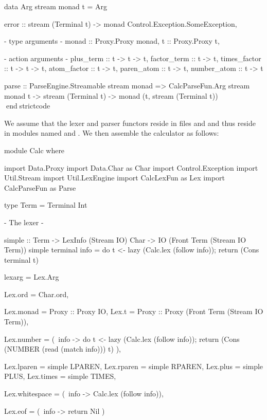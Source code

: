 \documentclass[10pt]{article}
\begin{document}
\begin{strictcode}
\begin{strictcode}
\begin{strictcode}
\begin{strictcode}
\begin{strictcode}
\begin{strictcode}
\begin{strictcode}
\begin{strictcode}
\begin{strictcode}
\begin{strictcode}
\begin{strictcode}
\begin{strictcode}
\begin{strictcode}
\begin{bigstrictcode}
\begin{strictcode}
\begin{strictcode}
\begin{bigstrictcode}
\begin{strictcode}
\begin{strictcode}
data Arg stream monad t =
   Arg { error :: stream (Terminal t) -> monad Control.Exception.SomeException,

         {- type arguments -}
         monad :: Proxy.Proxy monad,
         t :: Proxy.Proxy t,

         {- action arguments -}
         plus_term :: t -> t -> t,
         factor_term :: t -> t,
         times_factor :: t -> t -> t,
         atom_factor :: t -> t,
         paren_atom :: t -> t,
         number_atom :: t -> t }

parse :: ParseEngine.Streamable stream monad 
         => CalcParseFun.Arg stream monad t -> stream (Terminal t)
               -> monad (t, stream (Terminal t))
endstrictcode

We assume that the lexer and parser functors reside in files
 and  and thus reside in modules
named  and .  We then assemble the
calculator as follows:

\begin{bigstrictcode}
module Calc where

import Data.Proxy
import Data.Char as Char
import Control.Exception
import Util.Stream
import Util.LexEngine
import CalcLexFun as Lex
import CalcParseFun as Parse

type Term = Terminal Int


{- The lexer -}

simple :: Term -> LexInfo (Stream IO) Char -> IO (Front Term (Stream IO Term))
simple terminal info =
   do {
      t <- lazy (Calc.lex (follow info));
      return (Cons terminal t)
      }


lexarg =
   Lex.Arg
      {
      Lex.ord = Char.ord,

      Lex.monad = Proxy :: Proxy IO,
      Lex.t = Proxy :: Proxy (Front Term (Stream IO Term)),

      Lex.number =
         (\ info ->
             do {
                t <- lazy (Calc.lex (follow info));
                return (Cons (NUMBER (read (match info))) t)
                }),

      Lex.lparen = simple LPAREN,
      Lex.rparen = simple RPAREN,
      Lex.plus = simple PLUS,
      Lex.times = simple TIMES,

      Lex.whitespace =
         (\ info -> Calc.lex (follow info)),

      Lex.eof =
         (\ info -> return Nil )
      }



\end{bigstrictcode}
\end{strictcode}
\end{strictcode}
\end{bigstrictcode}
\end{strictcode}
\end{strictcode}
\end{bigstrictcode}
\end{strictcode}
\end{strictcode}
\end{strictcode}
\end{strictcode}
\end{strictcode}
\end{strictcode}
\end{strictcode}
\end{strictcode}
\end{strictcode}
\end{strictcode}
\end{strictcode}
\end{strictcode}
\end{strictcode}
\end{document}
